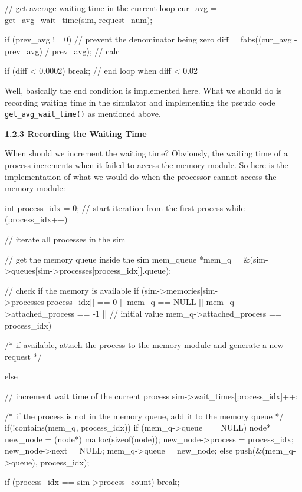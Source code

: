 \documentclass{article}%
\newenvironment{code}%
   {\snugshade\verbatim}%
   {\endverbatim\endsnugshade}
\begin{document}
\begin{Large}
\begin{code}
{        // get average waiting time in the current loop
        cur_avg = get_avg_wait_time(sim, request_num);
        
        if (prev_avg != 0) // prevent the denominator being zero
            diff = fabs((cur_avg - prev_avg) / prev_avg); // calc
            
        if (diff < 0.0002) break; // end loop when diff < 0.02%
    }
\end{code}
Well, basically the end condition is implemented here. What we should do is recording waiting time in the simulator and implementing the pseudo code \newline \texttt{get\_avg\_wait\_time()} as mentioned above.
\begin{flushleft}
\textbf{1.2.3 Recording the Waiting Time}
\end{flushleft}
When should we increment the waiting time? Obviously, the waiting time of a process increments when it failed to access the memory module. So here is the implementation of what we would do when the processor cannot access the memory module:

\newpage

\begin{code}
    int process_idx = 0; // start iteration from the first process
    while (process_idx++) { // iterate all processes in the sim
    
        // get the memory queue inside the sim
        mem_queue *mem_q = 
        &(sim->queues[sim->processes[process_idx]].queue);
        
        // check if the memory is available
        if (sim->memories[sim->processes[process_idx]] == 0 || 
        mem_q == NULL ||
        mem_q->attached_process == -1 || // initial value
        mem_q->attached_process == process_idx) {
				
            /* if available, 
               attach the process to the memory module 
               and generate a new request */
               
        } else {
        
            // increment wait time of the current process
            sim->wait_times[process_idx]++;
            
            /* if the process is not in the memory queue,
               add it to the memory queue */
            if(!contains(mem_q, process_idx)){
                if (mem_q->queue == NULL) {
                    node* new_node = (node*) malloc(sizeof(node));
                    new_node->process = process_idx;
                    new_node->next = NULL;
                    mem_q->queue = new_node;
                } else {
                    push(&(mem_q->queue), process_idx);
                }
            }
        }
        if (process_idx == sim->process_count) break;
    }
                

\end{code}
\end{Large}
\end{document}
